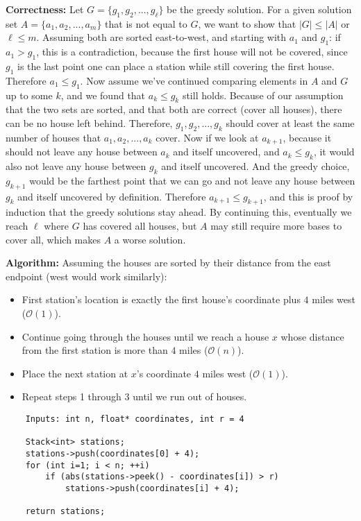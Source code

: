 \documentclass[12pt, letterpaper]{article}
\begin{document}
\vspace{7.5mm}
\noindent\textbf{Correctness:}
Let $G = \{ g_1, g_2, ..., g_{\ell} \}$ be the greedy solution. 
For a given solution set $A = \{ a_1, a_2, ..., a_m \}$ that is not equal to $G$, we want to show that $|G| \leq |A|$ or $\ell \leq m$.
Assuming both are sorted east-to-west, and starting with $a_1$ and $g_1$:
if $a_1 > g_1$, this is a contradiction, because the first house will not be covered, since $g_1$ is the last point one can place a station while still covering the first house.
Therefore $a_1 \leq g_1$.
Now assume we've continued comparing elements in $A$ and $G$ up to some $k$, and we found that $a_k \leq g_k$ still holds. 
Because of our assumption that the two sets are sorted, and that both are correct (cover all houses), there can be no house left behind.
Therefore, $g_1, g_2, ..., g_k$ should cover at least the same number of houses that $a_1, a_2, ..., a_k$ cover.
Now if we look at $a_{k+1}$, because it should not leave any house between $a_k$ and itself uncovered, and $a_k \leq g_k$, it would also not leave any house between $g_k$ and itself uncovered.
And the greedy choice, $g_{k+1}$ would be the farthest point that we can go and not leave any house between $g_k$ and itself uncovered by definition.
Therefore $a_{k+1} \leq g_{k+1}$, and this is proof by induction that the greedy solutions stay ahead.
By continuing this, eventually we reach $\ell$ where $G$ has covered all houses, but $A$ may still require more bases to cover all, which makes $A$ a worse solution.


\vspace{7.5mm}
\noindent\textbf{Algorithm:} Assuming the houses are sorted by their distance from the east endpoint (west would work similarly):
\begin{itemize}
    \item First station's location is exactly the first house's coordinate plus $4$ miles west ($\mathcal{O}(1)$).
    \item Continue going through the houses until we reach a house $x$ whose distance from the first station is more than $4$ miles ($\mathcal{O}(n)$).
    \item Place the next station at $x$'s coordinate $4$ miles west ($\mathcal{O}(1)$).
    \item Repeat steps 1 through 3 until we run out of houses.
\end{itemize}

\begin{verbatim}
    Inputs: int n, float* coordinates, int r = 4
    
    Stack<int> stations;
    stations->push(coordinates[0] + 4);
    for (int i=1; i < n; ++i)
        if (abs(stations->peek() - coordinates[i]) > r)
            stations->push(coordinates[i] + 4);

    return stations;
\end{verbatim}
\end{document}
